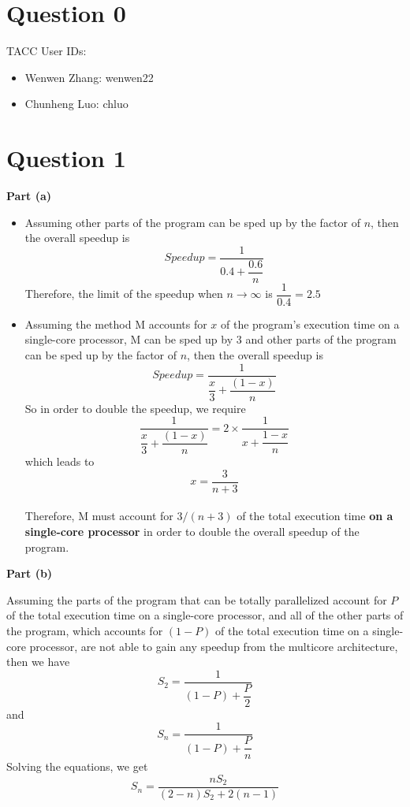 \documentclass[12pt]{article}
\begin{document}
\maketitle

\section*{Question 0} 
TACC User IDs:
\begin{itemize}
\vspace{-1ex}
\item Wenwen Zhang: wenwen22  \\
\vspace{-1ex}
\item Chunheng Luo: chluo     \\
\vspace{-1ex}
\end{itemize}

\section*{Question 1}

\textbf{Part (a)}
\vspace{-1ex}
\begin{itemize} 
\item Assuming other parts of the program can be sped up by the factor of $n$, then the overall speedup is $$Speedup = \dfrac{1}{0.4+\dfrac{0.6}{n}}$$ Therefore, the limit of the speedup when $n \rightarrow \infty$ is $\dfrac{1}{0.4} = 2.5$
\item Assuming the method M accounts for $x$ of the program's execution time on a single-core processor, M can be sped up by $3$ and other parts of the program can be sped up by the factor of $n$, then the overall speedup is $$Speedup = \dfrac{1}{\dfrac{x}{3} + \dfrac{(1-x)}{n}}$$
So in order to double the speedup, we require $$\dfrac{1}{ \dfrac{x}{3} + \dfrac{(1-x)}{n}} = 2\times\dfrac{1}{x+\dfrac{1 - x}{n}}$$ 
which leads to $$x = \dfrac{3}{n + 3}$$ \\
Therefore, M must account for $3/(n + 3)$ of the total execution time \textbf{on a single-core processor} in order to double the overall speedup of the program. 
\end{itemize}

\textbf{Part (b)}

Assuming the parts of the program that can be totally parallelized account for $P$ of the total execution time on a single-core processor, and all of the other parts of the program, which accounts for $(1-P)$ of the total execution time on a single-core processor, are not able to gain any speedup from the multicore architecture, then we have 
$$S_2 = \dfrac{1}{(1-P) + \dfrac{P}{2}}$$ and $$S_n = \dfrac{1}{(1-P) + \dfrac{P}{n}}$$
Solving the equations, we get $$S_n = \dfrac{nS_2}{(2-n)S_2 + 2(n-1)}$$ 
\end{document}

